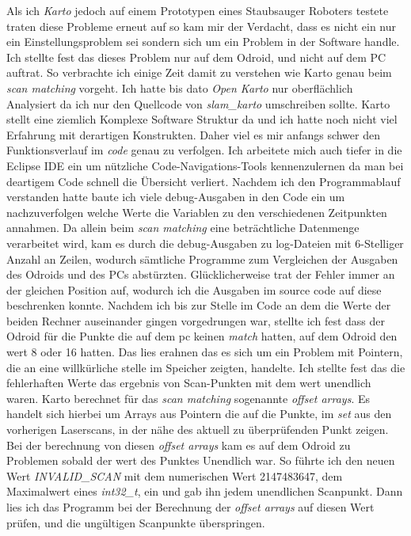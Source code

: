Als ich \emph{Karto} jedoch auf einem Prototypen eines Staubsauger Roboters testete traten diese Probleme erneut auf so kam mir der Verdacht, dass es nicht ein nur ein Einstellungsproblem sei sondern sich um ein Problem in der Software handle.
Ich stellte fest das dieses Problem nur auf dem Odroid, und nicht auf dem PC auftrat.
So verbrachte ich einige Zeit damit zu verstehen wie Karto genau beim \emph{scan matching} vorgeht. Ich hatte bis dato \emph{Open Karto} nur oberflächlich Analysiert da ich nur den Quellcode von \emph{slam\_karto} umschreiben sollte.
Karto stellt eine ziemlich Komplexe Software Struktur da und ich hatte noch nicht viel Erfahrung mit derartigen Konstrukten. Daher viel es mir anfangs schwer den Funktionsverlauf im \emph{code} genau zu verfolgen. 
Ich arbeitete mich auch tiefer in die \Gls{Eclipse IDE} ein um nützliche Code-Navigations-Tools kennenzulernen da man bei deartigem Code schnell die Übersicht verliert.
Nachdem ich den Programmablauf verstanden hatte baute ich viele \Gls{debug}-Ausgaben in den Code ein um nachzuverfolgen welche Werte die Variablen zu den verschiedenen Zeitpunkten annahmen.
Da allein beim \emph{scan matching} eine beträchtliche Datenmenge verarbeitet wird, kam es durch die \Gls{debug}-Ausgaben zu \Gls{log}-Dateien mit 6-Stelliger Anzahl an Zeilen, wodurch sämtliche Programme zum Vergleichen der Ausgaben des Odroids und des PCs abstürzten.
Glücklicherweise trat der Fehler immer an der gleichen Position auf, wodurch ich die Ausgaben im \Gls{source code} auf diese beschrenken konnte. 
Nachdem ich bis zur Stelle im Code an dem die Werte der beiden Rechner auseinander gingen vorgedrungen war, stellte ich fest dass der Odroid für die Punkte die auf dem pc keinen \emph{match} hatten, auf dem Odroid den wert 8 oder 16 hatten. 
Das lies erahnen das es sich um ein Problem mit Pointern, die an eine willkürliche stelle im Speicher zeigten, handelte.
Ich stellte fest das die fehlerhaften Werte das ergebnis von Scan-Punkten mit dem wert unendlich waren. 
Karto berechnet für das \emph{scan matching} sogenannte \emph{offset arrays}. Es handelt sich hierbei um Arrays aus Pointern die auf die Punkte, im \emph{set} aus den vorherigen Laserscans, in der nähe des aktuell zu überprüfenden Punkt zeigen. Bei der berechnung von diesen \emph{offset arrays} kam es auf dem Odroid zu Problemen sobald der wert des Punktes Unendlich war.
So führte ich den neuen Wert \emph{INVALID\_SCAN} mit dem numerischen Wert 2147483647, dem Maximalwert eines \emph{int32\_t}, ein und gab ihn jedem unendlichen Scanpunkt.
Dann lies ich das Programm bei der Berechnung der \emph{offset arrays} auf diesen Wert prüfen, und die ungültigen Scanpunkte überspringen. 


